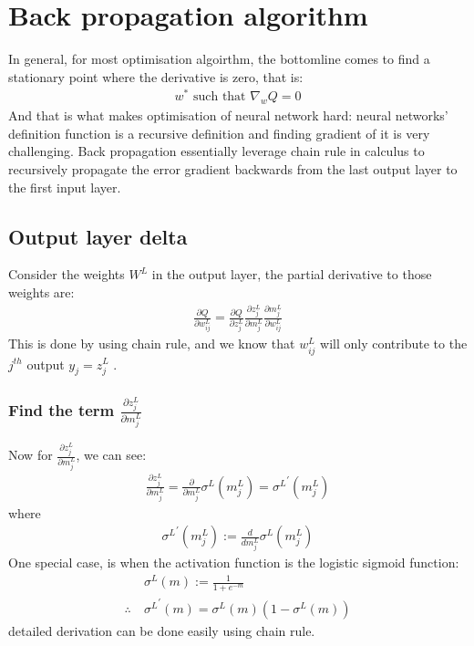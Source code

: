 \documentclass{article} [10pt] %
\begin{document}
\section{Back propagation algorithm}
In general, for most optimisation algoirthm, the bottomline comes to find a stationary point where the derivative is zero, that is:
\begin{align}
	w^* \text{ such that }\nabla_wQ = 0
\end{align}
And that is what makes optimisation of neural network hard: neural networks' definition function is a recursive definition and finding gradient of it is very challenging. Back propagation essentially leverage chain rule in calculus to recursively propagate the error gradient backwards from the last output layer to the first input layer.

\subsection{Output layer delta}
Consider the weights $W^L$ in the output layer, the partial derivative to those weights are:
\begin{align} \label{eq:output_delta}
\boxed{
	\frac{\partial Q}{\partial w^L_{ij}} = \frac{\partial Q}{\partial z^L_{j}}
							\frac{\partial z^L_{j}}{\partial m^L_{j}}
							\frac{\partial m^L_{j}}{\partial w^L_{ij}}
}
\end{align}
This is done by using chain rule, and we know that $w^L_{ij}$ will only contribute to the $j^{th}$ output $y_j=z^L_j$
.

\subsubsection{Find the term   $\frac{\partial z^L_{j}}{\partial m^L_{j}}$}
Now for $\frac{\partial z^L_{j}}{\partial m^L_{j}}$, we can see:
\begin{align} \label{eq:dzdm_sigmoid_derivative}
\boxed{
	\frac{\partial z^L_{j}}{\partial m^L_{j}} = \frac{\partial}{\partial m^L_{j}}\sigma^L(m^L_{j}) = {\sigma^L}^\prime(m^L_{j})
}
\end{align}
where
\begin{align}
	{\sigma^L}^\prime(m^L_{j}) := \frac{d}{dm^L_{j}}\sigma^L(m^L_{j})
\end{align}
One special case, is when the activation function is the logistic sigmoid function:
\begin{align}
	&\sigma^L(m) := \frac{1}{1+e^{-m}} \\
	\therefore \ &{\sigma^L}^\prime(m) = \sigma^L(m)(1-\sigma^L(m))
\end{align}
detailed derivation can be done easily using chain rule.
\end{document}
